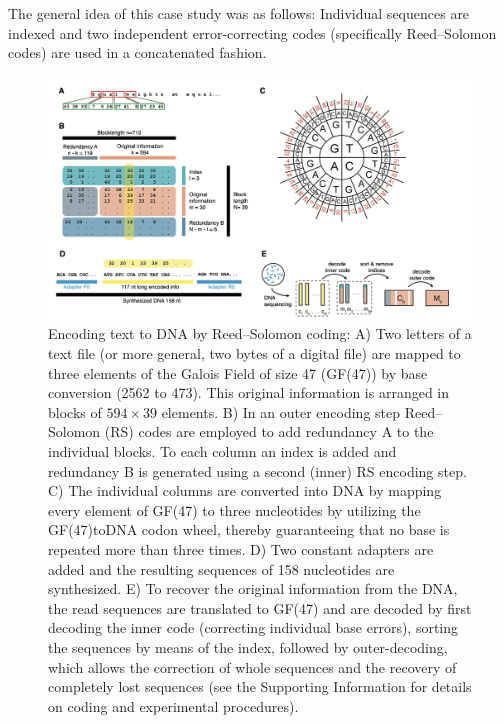 \documentclass[10pt,twocolumn,twoside]{gsajnl}
\begin{document}
The general idea of this case study was as follows: Individual sequences are indexed and two independent error-correcting codes (specifically Reed–Solomon codes) are used in a concatenated fashion.

\begin{figure}[h!]
    \includegraphics[width=\linewidth]{Figures/reed-solomon-error-correction.png}
    \caption{Encoding text to DNA by Reed–Solomon coding: A) Two letters of a text file (or more general, two bytes of a digital file) are mapped to three elements of the Galois Field of size 47 (GF(47)) by base conversion (2562 to 473). This original information is arranged in blocks of \(594 \times 39\) elements. B) In an outer encoding step Reed–Solomon (RS) codes are employed to add redundancy A to the individual blocks. To each column an index is added and redundancy B is generated using a second (inner) RS encoding step. C) The individual columns are converted into DNA by mapping every element of GF(47) to three nucleotides by utilizing the GF(47)toDNA codon wheel, thereby guaranteeing that no base is repeated more than three times. D) Two constant adapters are added and the resulting sequences of 158 nucleotides are synthesized. E) To recover the original information from the DNA, the read sequences are translated to GF(47) and are decoded by first decoding the inner code (correcting individual base errors), sorting the sequences by means of the index, followed by outer-decoding, which allows the correction of whole sequences and the recovery of completely lost sequences (see the Supporting Information for details on coding and experimental procedures).}
    \centering
   \label{fig:my_label5}
\end{figure}
\end{document}
